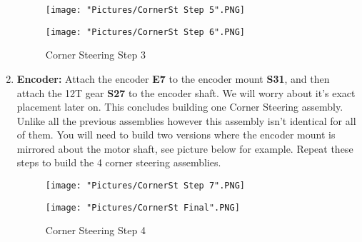 \documentclass[12pt]{article}
\begin{document}
\begin{enumerate}
\begin{figure}[H]
  \centering
  \begin{minipage}[b]{0.45\textwidth}
    \texttt{[image: "Pictures/CornerSt Step 5".PNG]}
  \end{minipage}
  \hfill
  \begin{minipage}[b]{0.45\textwidth}
    \texttt{[image: "Pictures/CornerSt Step 6".PNG]}
  \end{minipage}
  \caption{Corner Steering Step 3}
\end{figure}

\item \textbf{Encoder:} Attach the encoder \textbf{E7} to the encoder mount \textbf{S31}, and then attach the 12T gear \textbf{S27} to the encoder shaft. We will worry about it's exact placement later on. This concludes building one Corner Steering assembly. Unlike all the previous assemblies however this assembly isn't identical for all of them. You will need to build two versions where the encoder mount is mirrored about the motor shaft, see picture below for example. Repeat these steps to build the 4 corner steering assemblies. 

\begin{figure}[H]
  \centering
  \begin{minipage}[b]{0.45\textwidth}
    \texttt{[image: "Pictures/CornerSt Step 7".PNG]}
  \end{minipage}
  \hfill
  \begin{minipage}[b]{0.45\textwidth}
    \texttt{[image: "Pictures/CornerSt Final".PNG]}
  \end{minipage}
  \caption{Corner Steering Step 4}
\end{figure}

\end{enumerate}
\end{document}

